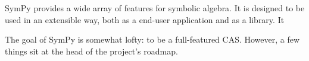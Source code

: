 SymPy provides a wide array of features for symbolic algebra. It is designed
to be used in an extensible way, both as a end-user application and as a
library. It

The goal of SymPy is somewhat lofty: to be a full-featured CAS\@. However, a
few things sit at the head of the project's roadmap.


%
